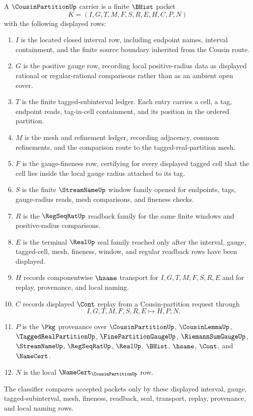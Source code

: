 \begin{definition}
\label{def:cousin-partition-carrier}
A $\CousinPartitionUp$ carrier is a finite $\BHist$ packet
$$
K=(I,G,T,M,F,S,R,E,H,C,P,N)
$$
with the following displayed rows:
\begin{enumerate}
\item $I$ is the located closed interval row, including endpoint names, interval containment, and the finite source boundary inherited from the Cousin route.
\item $G$ is the positive gauge row, recording local positive-radius data as displayed rational or regular-rational comparisons rather than as an ambient open cover.
\item $T$ is the finite tagged-subinterval ledger. Each entry carries a cell, a tag, endpoint reads, tag-in-cell containment, and its position in the ordered partition.
\item $M$ is the mesh and refinement ledger, recording adjacency, common refinements, and the comparison route to the tagged-real-partition mesh.
\item $F$ is the gauge-fineness row, certifying for every displayed tagged cell that the cell lies inside the local gauge radius attached to its tag.
\item $S$ is the finite $\StreamNameUp$ window family opened for endpoints, tags, gauge-radius reads, mesh comparisons, and fineness checks.
\item $R$ is the $\RegSeqRatUp$ readback family for the same finite windows and positive-radius comparisons.
\item $E$ is the terminal $\RealUp$ seal family reached only after the interval, gauge, tagged-cell, mesh, fineness, window, and regular readback rows have been displayed.
\item $H$ records componentwise $\hsame$ transport for $I,G,T,M,F,S,R,E$ and for replay, provenance, and local naming.
\item $C$ records displayed $\Cont$ replay from a Cousin-partition request through
$$
I,G,T,M,F,S,R,E \longmapsto H,P,N .
$$
\item $P$ is the $\Pkg$ provenance over $\CousinPartitionUp$, $\CousinLemmaUp$, $\TaggedRealPartitionUp$, $\FinePartitionGaugeUp$, $\RiemannSumGaugeUp$, $\StreamNameUp$, $\RegSeqRatUp$, $\RealUp$, $\BHist$, $\hsame$, $\Cont$, and $\NameCert$.
\item $N$ is the local $\NameCert_{\CousinPartitionUp}$ row.
\end{enumerate}
The classifier compares accepted packets only by these displayed interval, gauge, tagged-subinterval, mesh, fineness, readback, seal, transport, replay, provenance, and local naming rows.
\end{definition}

